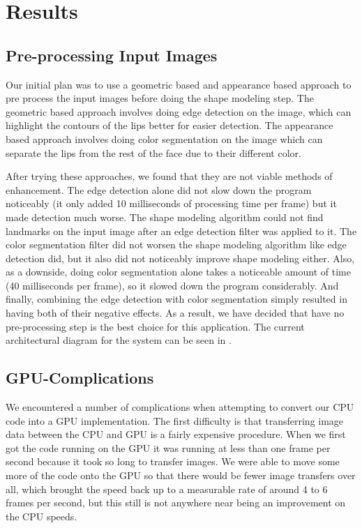 \chapter{Results}
\label{results}

\section{Pre-processing Input Images}
Our initial plan was to use a geometric based and appearance based approach to pre process the input images before doing the shape modeling step. The geometric based approach involves doing edge detection on the image, which can highlight the contours of the lips better for easier detection. The appearance based approach involves doing color segmentation on the image which can separate the lips from the rest of the face due to their different color. 

After trying these approaches, we found that they are not viable methods of enhancement. The edge detection alone did not slow down the program noticeably (it only added 10 milliseconds of processing time per frame) but it made detection much worse. The shape modeling algorithm could not find landmarks on the input image after an edge detection filter was applied to it. The color segmentation filter did not worsen the shape modeling algorithm like edge detection did, but it also did not noticeably improve shape modeling either. Also, as a downside, doing color segmentation alone takes a noticeable amount of time (40 milliseconds per frame), so it slowed down the program considerably. And finally, combining the edge detection with color segmentation simply resulted in having both of their negative effects. As a result, we have decided that have no pre-processing step is the best choice for this application. The current architectural diagram for the system can be seen in .

\section{GPU-Complications}

We encountered a number of complications when attempting to convert our CPU code into a GPU implementation. The first difficulty is that transferring image data between the CPU and GPU is a fairly expensive procedure. When we first got the code running on the GPU it was running at less than one frame per second because it took so long to transfer images. We were able to move some more of the code onto the GPU so that there would be fewer image transfers over all, which brought the speed back up to a measurable rate of around 4 to 6 frames per second, but this still is not anywhere near being an improvement on the CPU speeds.

